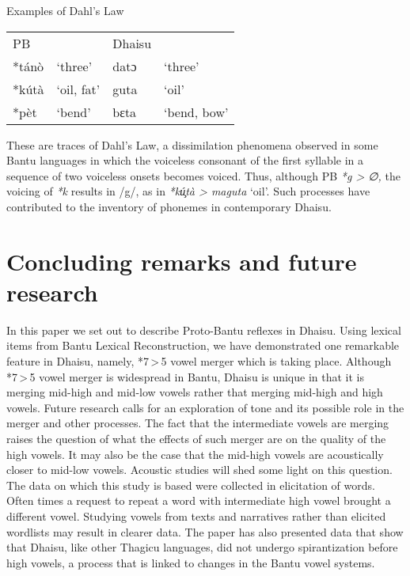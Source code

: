 \documentclass[output=paper,colorlinks,citecolor=brown]{langscibook}
\begin{document}
\begin{exe}
    \ex Examples of Dahl's Law \\
    \label{tab:ngonyani:19}
    \begin{tabular}{@{}l l l l@{}}
        PB & & Dhaisu &  \\
        *tánò & `three' & datɔ & `three'\\
        *kútà & `oil, fat' & guta & `oil'\\
        *pèt & `bend'&  bɛta & `bend, bow'\\
    \end{tabular}
\end{exe}
These are traces of Dahl’s Law, a dissimilation phenomena observed in some Bantu languages in which the voiceless consonant of the first syllable in a sequence of two voiceless onsets becomes voiced. Thus, although PB \textit{*g > ∅,} the voicing of \textit{*k} results in /g/, as in \textit{*kú̧tà > maguta} `oil'. Such processes have contributed to the inventory of phonemes in contemporary Dhaisu.

\section{Concluding remarks and future research}\label{sec:ngonyani:6}

In this paper we set out to describe Proto-Bantu reflexes in Dhaisu. Using lexical items from Bantu Lexical Reconstruction, we have demonstrated one remarkable feature in Dhaisu, namely, *7\,>\,5 vowel merger which is taking place. Although *7\,>\,5 vowel merger is widespread in Bantu, Dhaisu is unique in that it is merging mid-high and mid-low vowels rather that merging mid-high and high vowels. Future research calls for an exploration of tone and its possible role in the merger and other processes. The fact that the intermediate vowels are merging raises the question of what the effects of such merger are on the quality of the high vowels. It may also be the case that the mid-high vowels are acoustically closer to mid-low vowels. Acoustic studies will shed some light on this question. The data on which this study is based were collected in elicitation of words. Often times a request to repeat a word with intermediate high vowel brought a different vowel. Studying vowels from texts and narratives rather than elicited wordlists may result in clearer data. The paper has also presented data that show that Dhaisu, like other Thagicu languages, did not undergo spirantization before high vowels, a process that is linked to changes in the Bantu vowel systems. 
\end{document}

